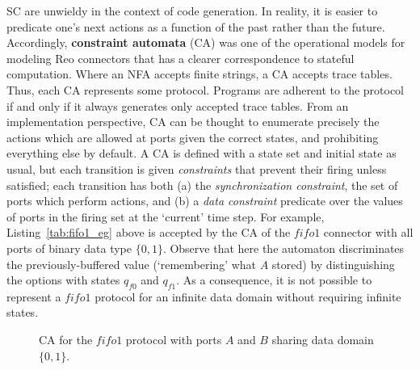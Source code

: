 SC are unwieldy in the context of code generation. In reality, it is easier to predicate one's next actions as a function of the past rather than the future. Accordingly, \textbf{constraint automata} (CA) was one of the operational models for modeling Reo connectors that has a clearer correspondence to stateful computation. Where an NFA accepts finite strings, a CA accepts trace tables. Thus, each CA represents some protocol. Programs are adherent to the protocol if and only if it always generates only accepted trace tables. From an implementation perspective, CA can be thought to enumerate precisely the actions which are allowed at ports given the correct states, and prohibiting everything else by default. A CA is defined with a state set and initial state as usual, but each transition is given \textit{constraints} that prevent their firing unless satisfied; each transition has both (a) the \textit{synchronization constraint}, the set of ports which perform actions, and (b) a \textit{data constraint} predicate over the values of ports in the firing set at the `current' time step. For example, Listing~\ref{tab:fifo1_eg} above is accepted by the CA of the $fifo1$ connector with all ports of binary data type $\{0,1\}$. Observe that here the automaton discriminates the previously-buffered value (`remembering' what $A$ stored) by distinguishing the options with states $q_{f0}$ and $q_{f1}$. As a consequence, it is not possible to represent a $fifo1$ protocol for an infinite data domain without requiring infinite states.
\begin{figure}[ht]
	\centering
	\caption[CA for fifo1 connector.]{CA for the $fifo1$ protocol with ports $A$ and $B$ sharing data domain $\{0,1\}$.}
	\label{fig:fifo1_ca}
\end{figure}

